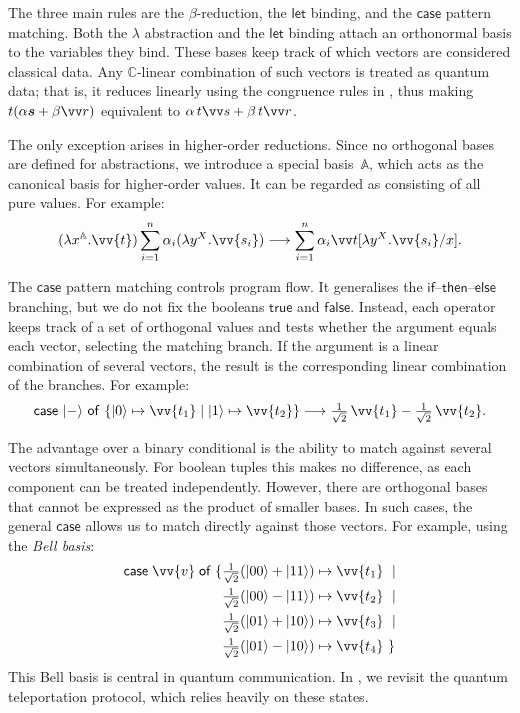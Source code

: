 \documentclass[runningheads,orivec,envcountsame,envcountsect]{llncs}
\newcommand\ket[1]{\ensuremath{|#1\rangle}}
\newcommand\lra{\longrightarrow}
\newcommand\AbsBasis{\ensuremath{\mathbb{A}}}
\def\C{\mathbb{C}}            %
\def\Lam#1#2#3{\lambda#1^{#2}{.}#3} %
\def\case#1#2#3#4#5{\ensuremath{\mathsf{case}~#1~\mathsf{of}~\{#2\mapsto #4 \mid #3\mapsto #5\}}}
\begin{document}
The three main rules are the $\beta$-reduction, the $\mathsf{let}$ binding, and
the $\mathsf{case}$ pattern matching. Both the $\lambda$ abstraction and the
$\mathsf{let}$ binding attach an orthonormal basis to the variables they bind.
These bases keep track of which vectors are considered classical data.  Any
$\C$-linear combination of such vectors is treated as quantum data; that is, it
reduces linearly using the congruence rules in
, thus making $t(\alpha\vec
s+\beta\vv r)$ equivalent to $\alpha\,t\vv s+\beta\,t\vv r$.

The only exception arises in higher-order reductions. Since no orthogonal bases
are defined for abstractions, we introduce a special basis~$\AbsBasis$, which
acts as the canonical basis for higher-order values. It can be regarded as consisting
of all pure values. For example:
\[
  (\Lam{x}{\AbsBasis}{\vv{t}})
  \sum_{i=1}^{n}\alpha_i(\Lam{y}{X}{\vv{s_i}})
  \lra
  \sum_{i=1}^n\alpha_i\vv t[\Lam{y}{X}{\vv{s_i}}/x].
\]

The $\mathsf{case}$ pattern matching controls program flow. It generalises the
$\mathsf{if}$--$\mathsf{then}$--$\mathsf{else}$ branching, but we do not fix
the booleans $\mathsf{true}$ and $\mathsf{false}$. Instead, each operator keeps
track of a set of orthogonal values and tests whether the argument equals each
vector, selecting the matching branch. If the argument is a linear combination
of several vectors, the result is the corresponding linear combination of the
branches. For example:
\[
  \case{\ket{-}}{\ket{0}}{\ket{1}}{\vv{t_1}}{\vv{t_2}} \lra
  \tfrac{1}{\sqrt{2}}\,\vv{t_1} - \tfrac{1}{\sqrt{2}}\,\vv{t_2}.
\]

The advantage over a binary conditional is the ability to match against several
vectors simultaneously. For boolean tuples this makes no difference, as each
component can be treated independently. However, there are orthogonal bases
that cannot be expressed as the product of smaller bases. In such cases, the
general $\mathsf{case}$ allows us to match directly against those vectors. For
example, using the \emph{Bell basis}:
\begin{align*}
  \mathsf{case}\;\vv{v}\;\mathsf{of}\;\{&
  \tfrac{1}{\sqrt{2}}(\ket{00}+\ket{11}) \mapsto \vv{t_1}\ \mid\\
  &\tfrac{1}{\sqrt{2}}(\ket{00}-\ket{11}) \mapsto \vv{t_2}\ \mid\\
  &\tfrac{1}{\sqrt{2}}(\ket{01}+\ket{10}) \mapsto \vv{t_3}\ \mid\\
  &\tfrac{1}{\sqrt{2}}(\ket{01}-\ket{10}) \mapsto \vv{t_4}\ \}
\end{align*}
This Bell basis is central in quantum communication. In
, we revisit the quantum teleportation protocol,
which relies heavily on these states.
\end{document}
